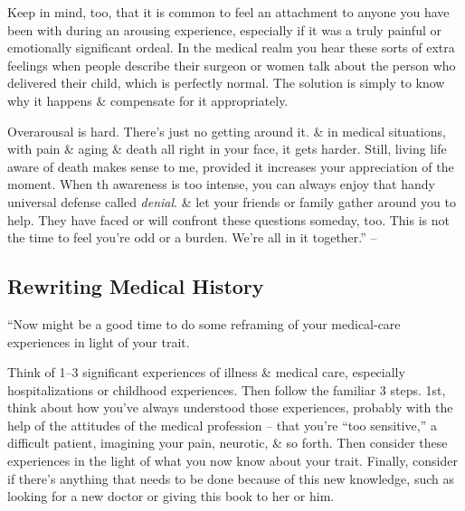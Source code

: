 \documentclass{article}
\numberwithin{equation}{section}
\begin{document}
Keep in mind, too, that it is common to feel an attachment to anyone you have been with during an arousing experience, especially if it was a truly painful or emotionally significant ordeal. In the medical realm you hear these sorts of extra feelings when people describe their surgeon or women talk about the person who delivered their child, which is perfectly normal. The solution is simply to know why it happens \& compensate for it appropriately.

Overarousal is hard. There's just no getting around it. \& in medical situations, with pain \& aging \& death all right in your face, it gets harder. Still, living life aware of death makes sense to me, provided it increases your appreciation of the moment. When th awareness is too intense, you can always enjoy that handy universal defense called \textit{denial}. \& let your friends or family gather around you to help. They have faced or will confront these questions someday, too. This is not the time to feel you're odd or a burden. We're all in it together.'' -- \cite[pp. 220--224]{Aron2013}

\subsection{Rewriting Medical History}
``Now might be a good time to do some reframing of your medical-care experiences in light of your trait.

Think of 1--3 significant experiences of illness \& medical care, especially hospitalizations or childhood experiences. Then follow the familiar 3 steps. 1st, think about how you've always understood those experiences, probably with the help of the attitudes of the medical profession -- that you're ``too sensitive,'' a difficult patient, imagining your pain, neurotic, \& so forth. Then consider these experiences in the light of what you now know about your trait. Finally, consider if there's anything that needs to be done because of this new knowledge, such as looking for a new doctor or giving this book to her or him.
\end{document}

